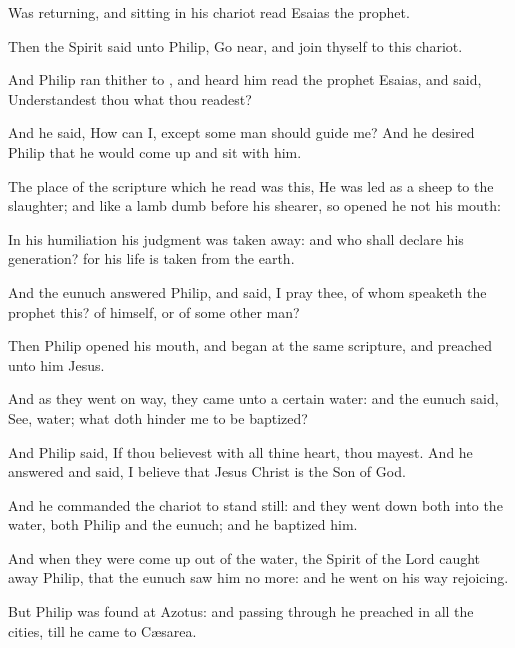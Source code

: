 {Was
returning,
and
sitting
in
his
chariot
read
Esaias the
prophet.

Then the
Spirit
said unto
Philip, Go
near,
and join
thyself to
this
chariot.

And
Philip ran
thither to
{}, and
heard
him
read the
prophet
Esaias,
and
said, Understandest
thou
what thou
readest?

And he
said,
How can
I,
except some
man should
guide
me?
And he
desired
Philip that he would come
up and
sit
with
him.

The
place of the
scripture
which he
read
was
this, He was
led
as a
sheep
to the
slaughter;
and
like a
lamb
dumb
before
his
shearer,
so opened
he
not
his
mouth:

In
his
humiliation
his
judgment was taken
away:
and
who shall
declare
his
generation?
for
his
life is
taken
from the
earth.

And the
eunuch
answered
Philip, and
said, I
pray
thee,
of
whom
speaketh the
prophet
this?
of
himself,
or
of
some other
man?

Then
Philip
opened
his
mouth,
and
began
at the
same
scripture, and
preached unto
him
Jesus.

And
as they
went
on
{}
way, they
came
unto a
certain
water:
and the
eunuch
said,
See,
{}
water;
what doth
hinder
me to be
baptized?

And
Philip
said,
If thou
believest
with
all thine
heart, thou
mayest. And he
answered
and
said, I
believe that
Jesus
Christ
is the
Son of
God.

And he
commanded the
chariot to stand
still:
and they went
down
both
into the
water,
both
Philip
and the
eunuch;
and he
baptized
him.

And
when they were come
up out
of the
water, the
Spirit of the
Lord caught
away
Philip,
that the
eunuch
saw
him no
more:
and he
went on
his
way
rejoicing.

But
Philip was
found
at
Azotus:
and passing
through he
preached in
all the
cities,
till
he
came
to
Cæsarea.




\par }
